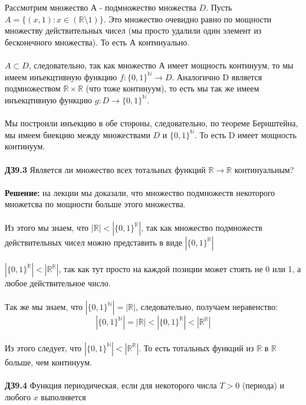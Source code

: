 \documentclass[a4paper, 12pt]{article}
\begin{document}
    \\ 
    \\ Рассмотрим множество А - подмножество множества $D$. Пусть $A = \{(x, 1): x \in (\mathbb{R} \setminus 1) \}$. Это множество очевидно равно по мощности множеству действительных чисел (мы просто удалили один элемент из бесконечного множества). То есть А континуально.
    \\ 
    \\ $A \subset D$, следовательно, так как множество А имеет мощность континуум, то мы имеем инъекцтивную функцию $f: \{0, 1\}^{\mathbb{N}} \to D$. Аналогично D является подмножеством $\mathbb{R} \times \mathbb{R}$ (что тоже континуум), то есть мы так же имеем инъекцтивную функцию $g: D \to \{0, 1\}^{\mathbb{N}}$.
    \\
    \\ Мы построили инъекцию в обе стороны, следовательно, по теореме Бернштейна, мы имеем биекцию между множествами $D$ и $\{0, 1\}^{\mathbb{N}}$. То есть D имеет мощность континуум.
    \\
    \\ \textbf{ДЗ9.3} Является ли множество всех тотальных функций $\mathbb{R} \to \mathbb{R}$ континуальным?
    \\
    \\ \textbf{Решение: } на лекции мы доказали, что множество подмножеств некоторого множетсва по мощности больше этого множества.
    \\
    \\ Из этого мы знаем, что $|\mathbb{R}| < |\{0, 1\}^{\mathbb{R}}|$, так как множество подмножеств действительных чисел можно представить в виде $|\{0, 1\}^{\mathbb{R}}|$
    \\
    \\ $|\{0, 1\}^{\mathbb{R}}| < |\mathbb{R}^{\mathbb{R}}|$, так как тут просто на каждой позиции может стоять не 0 или 1, а любое действительное число.
    \\
    \\ Так же мы знаем, что $|\{0, 1\}^{\mathbb{N}}| = |\mathbb{R}|$, следовательно, получаем неравенство: 
    \[|\{0, 1\}^{\mathbb{N}}| = |\mathbb{R}| < |\{0, 1\}^{\mathbb{R}}| < |\mathbb{R}^{\mathbb{R}}|\]
    \\ Из этого следует, что $|\{0, 1\}^{\mathbb{N}}| < |\mathbb{R}^{\mathbb{R}}|$. То есть тотальных функций из $\mathbb{R}$ в $\mathbb{R}$ больше, чем континуум.
    \\
    \\ \textbf{ДЗ9.4} Функция периодическая, если для некоторого числа $T > 0$ (периода) и любого $x$ выполняется
\end{document}
